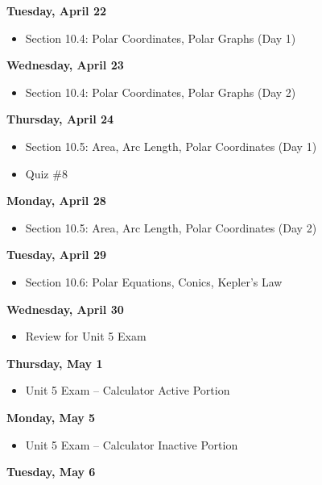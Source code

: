 \documentclass[11pt]{article}
\begin{document}
\textbf{Tuesday, April 22}

\begin{itemize}
\item Section 10.4: Polar Coordinates, Polar Graphs (Day 1)
\end{itemize}

\textbf{Wednesday, April 23}

\begin{itemize}
\item Section 10.4: Polar Coordinates, Polar Graphs (Day 2)
\end{itemize}

\textbf{Thursday, April 24}

\begin{itemize}
\item Section 10.5: Area, Arc Length, Polar Coordinates (Day 1)
\item Quiz \#8
\end{itemize}

\textbf{Monday, April 28}

\begin{itemize}
\item Section 10.5: Area, Arc Length, Polar Coordinates (Day 2)
\end{itemize}

\textbf{Tuesday, April 29}

\begin{itemize}
\item Section 10.6: Polar Equations, Conics, Kepler's Law
\end{itemize}

\textbf{Wednesday, April 30}

\begin{itemize}
\item Review for Unit 5 Exam
\end{itemize}

\textbf{Thursday, May 1}

\begin{itemize}
\item Unit 5 Exam -- Calculator Active Portion
\end{itemize}

\textbf{Monday, May 5}

\begin{itemize}
\item Unit 5 Exam -- Calculator Inactive Portion
\end{itemize}

\textbf{Tuesday, May 6}
\end{document}
